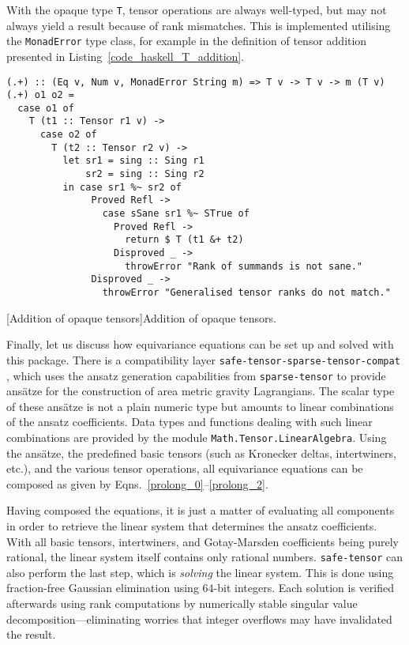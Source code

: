 With the opaque type \texttt{T}, tensor operations are always well-typed, but may not always yield a result because of rank mismatches. This is implemented utilising the \texttt{MonadError} type class, for example in the definition of tensor addition presented in Listing~\ref{code_haskell_T_addition}.

\begin{code}
  \begin{verbatim}
(.+) :: (Eq v, Num v, MonadError String m) => T v -> T v -> m (T v)
(.+) o1 o2 =
  case o1 of
    T (t1 :: Tensor r1 v) ->
      case o2 of
        T (t2 :: Tensor r2 v) ->
          let sr1 = sing :: Sing r1
              sr2 = sing :: Sing r2
          in case sr1 %~ sr2 of
               Proved Refl ->
                 case sSane sr1 %~ STrue of
                   Proved Refl ->
                     return $ T (t1 &+ t2)
                   Disproved _ ->
                     throwError "Rank of summands is not sane."
               Disproved _ ->
                 throwError "Generalised tensor ranks do not match."
  \end{verbatim}
  [Addition of opaque tensors]{Addition of opaque tensors.}
  \label{code_haskell_T_addition}
\end{code}

Finally, let us discuss how equivariance equations can be set up and solved with this package. There is a compatibility layer \texttt{safe-tensor-sparse-tensor-compat} \cite{Alex_2020_safe-tensor}, which uses the ansatz generation capabilities from \texttt{sparse-tensor} to provide ansätze for the construction of area metric gravity Lagrangians. The scalar type of these ansätze is not a plain numeric type but amounts to linear combinations of the ansatz coefficients. Data types and functions dealing with such linear combinations are provided by the module \texttt{Math.Tensor.LinearAlgebra}. Using the ansätze, the predefined basic tensors (such as Kronecker deltas, intertwiners, etc.), and the various tensor operations, all equivariance equations can be composed as given by Eqns.\ \eqref{prolong_0}--\eqref{prolong_2}.

Having composed the equations, it is just a matter of evaluating all components in order to retrieve the linear system that determines the ansatz coefficients. With all basic tensors, intertwiners, and Gotay-Marsden coefficients being purely rational, the linear system itself contains only rational numbers. \texttt{safe-tensor} can also perform the last step, which is \emph{solving} the linear system. This is done using fraction-free Gaussian elimination using 64-bit integers. Each solution is verified afterwards using rank computations by numerically stable singular value decomposition---eliminating worries that integer overflows may have invalidated the result.


